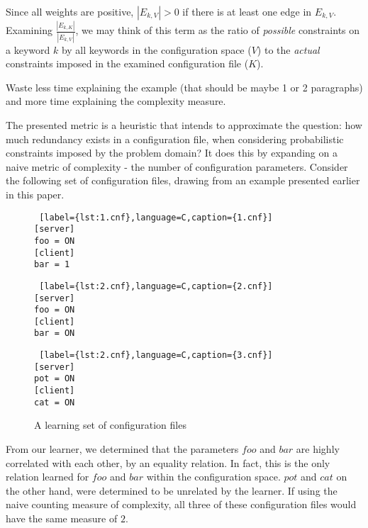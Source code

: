 Since all weights are positive, $|E_{k, V}| > 0$ if there is at least one 
edge in $E_{k, V}$. Examining $\frac{|E_{k, K}|}{|E_{k, V}|}$, we may think of this
term as the ratio of {\it possible} constraints on a keyword $k$ by all keywords
in the configuration space ($V$) to the {\it actual} constraints imposed in the
examined configuration file ($K$).

Waste less time explaining the example (that should be maybe 1 or 2 paragraphs) and more time explaining the complexity measure.

The presented metric is a heuristic that intends to approximate the question: 
how much redundancy exists in a configuration file, when considering
probabilistic constraints imposed by the problem domain? It does this by
expanding on a naive metric of complexity - the number of configuration 
parameters. Consider the following set of configuration files, drawing from
an example presented earlier in this paper.

\begin{figure}[!htb]
    \centering
    \begin{minipage}{.25\textwidth}
    \begin{lstlisting} [label={lst:1.cnf},language=C,caption={1.cnf}]
[server]
foo = ON
[client]
bar = 1
    \end{lstlisting}
    \end{minipage}%
    \hspace{1cm}
    \begin{minipage}{0.25\textwidth}
    \begin{lstlisting} [label={lst:2.cnf},language=C,caption={2.cnf}]
[server]
foo = ON
[client]
bar = ON
    \end{lstlisting}
    \end{minipage}
    \hspace{1cm}
    \begin{minipage}{0.25\textwidth}
    \begin{lstlisting} [label={lst:2.cnf},language=C,caption={3.cnf}]
[server]
pot = ON
[client]
cat = ON
    \end{lstlisting}
    \end{minipage}
    \caption{A learning set of configuration files}
    \label{fig:complexityset}
\end{figure}

From our learner, we determined that the parameters $foo$ and $bar$ are
highly correlated with each other, by an equality relation. In fact, this
is the only relation learned for $foo$ and $bar$ within the configuration
space. $pot$ and $cat$ on the other hand, were determined to be unrelated
by the learner. If using the naive counting measure of complexity, all 
three of these configuration files would have the same measure of $2$.

